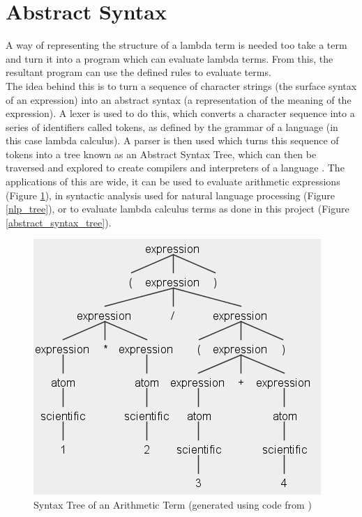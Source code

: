 \documentclass[a4paper,11pt]{report}
\begin{document}
\section{Abstract Syntax}

A way of representing the structure of a lambda term is needed too take a term and turn it into a program which can evaluate lambda terms. From this, the resultant program can use the defined rules to evaluate terms.\\

The idea behind this is to turn a sequence of character strings (the surface syntax of an expression) into an abstract syntax (a representation of the meaning of the expression). A lexer is used to do this, which converts a character sequence into a series of identifiers called tokens, as defined by the grammar of a language (in this case lambda calculus). A parser is then used which turns this sequence of tokens into a tree known as an Abstract Syntax Tree, which can then be traversed and explored to create compilers and interpreters of a language \cite{Pierce2002}. The applications of this are wide, it can be used to evaluate arithmetic expressions (Figure \ref{arithmetic_syntax_tree}), in syntactic analysis used for natural language processing \cite{Bird2009} (Figure \ref{nlp_tree}), or to evaluate lambda calculus terms as done in this project (Figure \ref{abstract_syntax_tree}).

\begin{figure}[p]
	\centering
	\includegraphics[scale=0.75]{images/arithmetic_syntax_tree}
	\caption{Syntax Tree of an Arithmetic Term (generated using code from \protect\cite{Everett2019})}
	\label{arithmetic_syntax_tree}
\end{figure}
\end{document}

